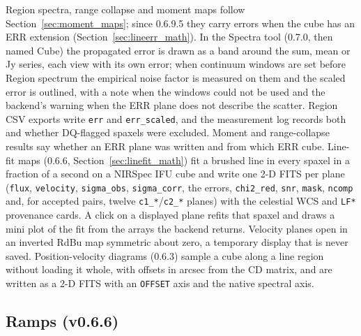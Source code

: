 \documentclass[11pt,a4paper]{article}
\newcommand{\code}[1]{\texttt{\small #1}}
\begin{document}
    Region spectra, range collapse and moment maps follow Section~\ref{sec:moment_maps}; since 0.6.9.5 they carry errors when the cube has an ERR extension (Section~\ref{sec:lineerr_math}). In the Spectra tool (0.7.0, then named Cube) the propagated error is drawn as a band around the sum, mean or Jy series, each view with its own error; when continuum windows are set before Region spectrum the empirical noise factor is measured on them and the scaled error is outlined, with a note when the windows could not be used and the backend's warning when the ERR plane does not describe the scatter. Region CSV exports write \code{err} and \code{err\_scaled}, and the measurement log records both and whether DQ-flagged spaxels were excluded. Moment and range-collapse results say whether an ERR plane was written and from which ERR cube. Line-fit maps (0.6.6, Section~\ref{sec:linefit_math}) fit a brushed line in every spaxel in a fraction of a second on a NIRSpec IFU cube and write one 2-D FITS per plane (\code{flux}, \code{velocity}, \code{sigma\_obs}, \code{sigma\_corr}, the errors, \code{chi2\_red}, \code{snr}, \code{mask}, \code{ncomp} and, for accepted pairs, twelve \code{c1\_*}/\code{c2\_*} planes) with the celestial WCS and \code{LF*} provenance cards. A click on a displayed plane refits that spaxel and draws a mini plot of the fit from the arrays the backend returns. Velocity planes open in an inverted RdBu map symmetric about zero, a temporary display that is never saved. Position-velocity diagrams (0.6.3) sample a cube along a line region without loading it whole, with offsets in arcsec from the CD matrix, and are written as a 2-D FITS with an \code{OFFSET} axis and the native spectral axis.

    \subsection{Ramps (v0.6.6)}
\end{document}
